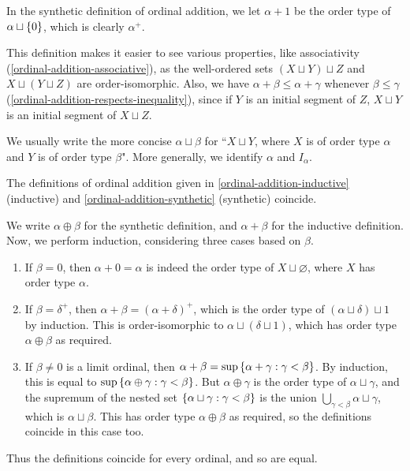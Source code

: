 \documentclass{article}
\begin{document}
\begin{note}
	In the synthetic definition of ordinal addition, we let $\alpha + 1$ be the order type of $\alpha \sqcup \left\lbrace 0 \right\rbrace$, which is clearly $\alpha^+$.
\end{note}

\begin{note}
	This definition makes it easier to see various properties, like associativity (\ref{ordinal-addition-associative}), as the well-ordered sets $(X \sqcup Y) \sqcup Z$ and $X \sqcup (Y \sqcup Z)$ are order-isomorphic. Also, we have $\alpha + \beta \leq \alpha + \gamma$ whenever $\beta \leq \gamma$ (\ref{ordinal-addition-respects-inequality}), since if $Y$ is an initial segment of $Z$, $X \sqcup Y$ is an initial segment of $X \sqcup Z$.
\end{note}

\begin{note}
	We usually write the more concise $\alpha \sqcup \beta$ for ``$X \sqcup Y$, where $X$ is of order type $\alpha$ and $Y$ is of order type $\beta$". More generally, we identify $\alpha$ and $I_\alpha$.
\end{note}

\begin{proposition}
    The definitions of ordinal addition given in \ref{ordinal-addition-inductive} (inductive) and \ref{ordinal-addition-synthetic} (synthetic) coincide.
\end{proposition}

\begin{prf}
    We write $\alpha \oplus \beta$ for the synthetic definition, and $\alpha + \beta$ for the inductive definition. Now, we perform induction, considering three cases based on $\beta$.
    \begin{enumerate}
    	\item If $\beta = 0$, then $\alpha + 0 = \alpha$ is indeed the order type of $X \sqcup \varnothing$, where $X$ has order type $\alpha$.
    	\item If $\beta = \delta^+$, then $\alpha + \beta = (\alpha + \delta)^+$, which is the order type of $(\alpha \sqcup \delta) \sqcup 1$ by induction. This is order-isomorphic to $\alpha \sqcup (\delta \sqcup 1)$, which has order type $\alpha \oplus \beta$ as required.
    	\item If $\beta \neq 0$ is a limit ordinal, then $\alpha + \beta = \sup \left\lbrace \alpha + \gamma : \gamma < \beta \right\rbrace$. By induction, this is equal to $\sup \left\lbrace \alpha \oplus \gamma : \gamma < \beta \right\rbrace$. But $\alpha \oplus \gamma$ is the order type of $\alpha \sqcup \gamma$, and the supremum of the nested set $\left\lbrace \alpha \sqcup \gamma : \gamma < \beta \right\rbrace$ is the union $\bigcup_{\gamma < \beta} \alpha \sqcup \gamma$, which is $\alpha \sqcup \beta$. This has order type $\alpha \oplus \beta$ as required, so the definitions coincide in this case too.
	\end{enumerate}
	Thus the definitions coincide for every ordinal, and so are equal.
\end{prf}
\end{document}
